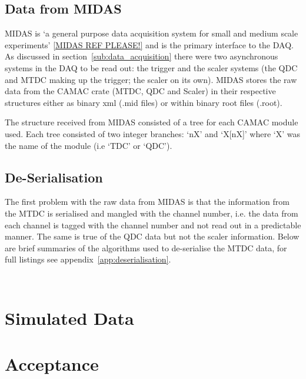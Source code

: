 \documentclass[]{article}
\begin{document}
\subsection{Data from MIDAS} %
\label{sub:data_from_midas}
MIDAS is `a general purpose data acquisition system for small and medium scale experiments' \ref{MIDAS REF PLEASE!} and is the primary interface to the DAQ. As discussed in section~\ref{sub:data_acquisition} there were two asynchronous systems in the DAQ to be read out: the trigger and the scaler systems (the QDC and MTDC making up the trigger; the scaler on its own). MIDAS stores the raw data from the CAMAC crate (MTDC, QDC and Scaler) in their respective structures either as binary xml (.mid files) or within binary root files (.root).

The structure received from MIDAS consisted of a tree for each CAMAC module used. Each tree consisted of two integer branches: `nX' and `X[nX]' where `X' was the name of the module (i.e `TDC' or `QDC').
\subsection{De-Serialisation} %
\label{sub:de_serialisation}
The first problem with the raw data from MIDAS is that the information from the MTDC is serialised and mangled with the channel number, i.e. the data from each channel is tagged with the channel number and not read out in a predictable manner. The same is true of the QDC data but not the scaler information. Below are brief summaries of the algorithms used to de-serialise the MTDC data, for full listings see appendix~\ref{app:deserialisation}.
\begin{lstlisting}[caption={Pseudo-code demonstrating the de-serialisation of the raw MTDC data from MIDAS (for a )},label=lst:lab,float=htbp]
	
\end{lstlisting}
\section{Simulated Data} %
\label{sec:simulated_data}

\section{Acceptance} %
\label{sec:acceptance}
\end{document}
